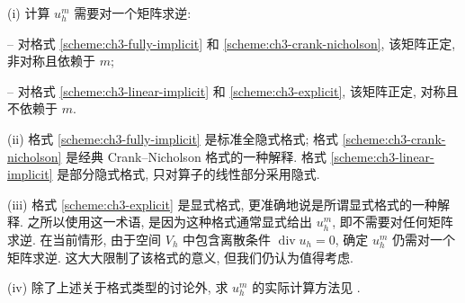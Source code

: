 \begin{Remark}
\label{rem:ch3-discrete-matrix-properties}
(i) 计算 $u_h^m$ 需要对一个矩阵求逆:

-- 对格式 \ref{scheme:ch3-fully-implicit} 和 \ref{scheme:ch3-crank-nicholson}, 该矩阵正定, 非对称且依赖于 $m$;

-- 对格式 \ref{scheme:ch3-linear-implicit} 和 \ref{scheme:ch3-explicit}, 该矩阵正定, 对称且不依赖于 $m$.

(ii) 格式 \ref{scheme:ch3-fully-implicit} 是标准全隐式格式; 格式 \ref{scheme:ch3-crank-nicholson} 是经典 Crank--Nicholson 格式的一种解释. 格式 \ref{scheme:ch3-linear-implicit} 是部分隐式格式, 只对算子的线性部分采用隐式.

(iii) 格式 \ref{scheme:ch3-explicit} 是显式格式, 更准确地说是所谓显式格式的一种解释. 之所以使用这一术语, 是因为这种格式通常显式给出 $u_h^m$, 即不需要对任何矩阵求逆. 在当前情形, 由于空间 $V_h$ 中包含离散条件 $\operatorname{div}u_h=0$, 确定 $u_h^m$ 仍需对一个矩阵求逆. 这大大限制了该格式的意义, 但我们仍认为值得考虑.

(iv) 除了上述关于格式类型的讨论外, 求 $u_h^m$ 的实际计算方法见 .
\end{Remark}


